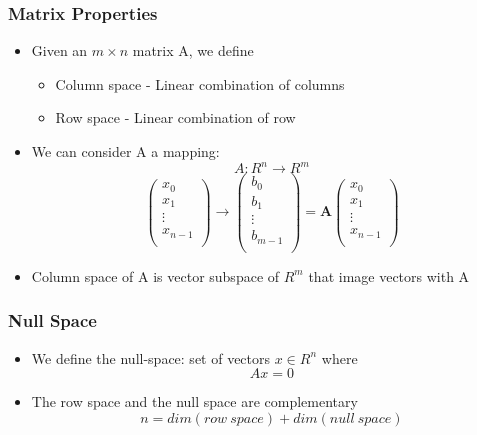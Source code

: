 \documentclass[10pt]{beamer}
\begin{document}
\begin{frame}
  \frametitle{Matrix Properties}
  \begin{itemize}
  \item Given an $m \times n$ matrix A, we define
    \begin{itemize}
    \item Column space - Linear combination of columns
    \item Row space - Linear combination of row
    \end{itemize}
  \item We can consider A a mapping:
    \[
      A: R^n \rightarrow R^m
    \]
    \[
      \left(
        \begin{array}{c}
          x_0 \\ x_1 \\ \vdots \\ x_{n-1} \\
        \end{array}
      \right) \rightarrow
      \left(
        \begin{array}{c}
          b_0 \\ b_1 \\ \vdots \\ b_{m-1} \\
        \end{array}
      \right) =
      \mathbf{A}
      \left(
        \begin{array}{c}
          x_0 \\ x_1 \\ \vdots \\ x_{n-1} \\
        \end{array}
      \right)
    \]
  \item Column space of A is vector subspace of $R^m$ that image
    vectors with A
  \end{itemize}
\end{frame}

\begin{frame}
  \frametitle{Null Space}
  \begin{itemize}
  \item We define the null-space: set of vectors $x \in R^n$ where
    \[
      A x = 0
    \]
  \item The row space and the null space are complementary
    \[
      n = dim(row~space) + dim(null~space)
    \]
  \end{itemize}
\end{frame}
\end{document}

